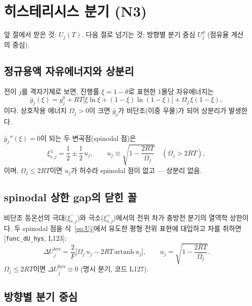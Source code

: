 \documentclass[11pt,a4paper]{article}
\newcommand{\hys}{\mathrm{hys}}
\begin{document}
\section{히스테리시스 분기 (N3)}
\label{sec:hys}
앞 절에서 받은 것: $U_j(T)$.
다음 절로 넘기는 것: 방향별 분기 중심 $U_j^d$ (점유율 계산의 중심).

\subsection{정규용액 자유에너지와 상분리}

전이 $j$를 격자기체로 보면, 진행률 $\xi = 1-\theta$로 표현한
1몰당 자유에너지는
\begin{equation}
  \bar{g}_j(\xi) = g_j^0 + RT\big[\xi\ln\xi + (1-\xi)\ln(1-\xi)\big]
                 + \Omega_j\,\xi(1-\xi),
  \label{eq:gxi}
\end{equation}
이다. 상호작용 에너지 $\Omega_j > 0$이 크면 $\bar{g}_j$가 비단조(이중 우물)가 되어
상분리가 발생한다.

$\bar{g}_j''(\xi)=0$이 되는 두 변곡점(spinodal 점)은
\begin{equation}
  \xi_{s,j}^\pm = \frac12 \pm \frac12\,u_j, \qquad
  u_j \equiv \sqrt{1 - \frac{2RT}{\Omega_j}} \quad(\Omega_j > 2RT),
  \label{eq:spinodal}
\end{equation}
이며, $\Omega_j \le 2RT$이면 $u_j$가 허수라 spinodal 점이 없고 — 상분리 없음.

\subsection{spinodal 상한 gap의 닫힌 꼴}

비단조 등온선의 극대($\xi_{s,j}^-$)와 극소($\xi_{s,j}^+$)에서의 전위 차가
충방전 분기의 열역학 상한이다. 두 spinodal 점을 식~\eqref{eq:Uj}에서 유도한
평형 전위 표현에 대입하고 차를 취하면 [\texttt{func\_dU\_hys}, L123]:
\begin{equation}
  \boxed{\Delta U_j^\hys = \frac{2}{F}\Big[\Omega_j\,u_j - 2RT\,\mathrm{artanh}\,u_j\Big],
  \qquad u_j = \sqrt{1-\frac{2RT}{\Omega_j}}.}
  \label{eq:hysdU}
\end{equation}
$\Omega_j \le 2RT$이면 $\Delta U_j^\hys \equiv 0$ (명시 분기, 코드 L127).

\subsection{방향별 분기 중심}
\end{document}
